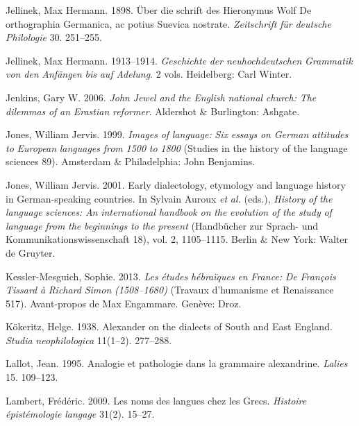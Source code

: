 \documentclass[output=paper]{langsci/langscibook}
\begin{document}
Jellinek, Max Hermann. 1898. Über die schrift des Hieronymus Wolf De orthographia Germanica, ac potius Suevica nostrate. \textit{Zeitschrift} \textit{für} \textit{deutsche} \textit{Philologie} 30. 251–255.

Jellinek, Max Hermann. 1913–1914. \textit{Geschichte} \textit{der} \textit{neuhochdeutschen} \textit{Grammatik} \textit{von} \textit{den} \textit{Anfängen} \textit{bis} \textit{auf} \textit{Adelung}. 2 vols. Heidelberg: Carl Winter.

Jenkins, Gary W. 2006. \textit{John} \textit{Jewel} \textit{and} \textit{the} \textit{English} \textit{national} \textit{church:} \textit{The} \textit{dilemmas} \textit{of} \textit{an} \textit{Erastian} \textit{reformer}. Aldershot \& Burlington: Ashgate.

Jones, William Jervis. 1999. \textit{Images} \textit{of} \textit{language:} \textit{Six} \textit{essays} \textit{on} \textit{German} \textit{attitudes} \textit{to} \textit{European} \textit{languages} \textit{from} \textit{1500} \textit{to} \textit{1800} (Studies in the history of the language sciences 89). Amsterdam \& Philadelphia: John Benjamins.

Jones, William Jervis. 2001. Early dialectology, etymology and language history in German-speaking countries. In Sylvain Auroux \textit{et} \textit{al.} (eds.), \textit{History} \textit{of} \textit{the} \textit{language} \textit{sciences:} \textit{An} \textit{international} \textit{handbook} \textit{on} \textit{the} \textit{evolution} \textit{of} \textit{the} \textit{study} \textit{of} \textit{language} \textit{from} \textit{the} \textit{beginnings} \textit{to} \textit{the} \textit{present} (Handbücher zur Sprach- und Kommunikationswissenschaft 18), vol. 2, 1105–1115. Berlin \& New York: Walter de Gruyter.

Kessler-Mesguich, Sophie. 2013. \textit{Les} \textit{études} \textit{hébraïques} \textit{en} \textit{France:} \textit{De} \textit{François} \textit{Tissard} \textit{à} \textit{Richard} \textit{Simon} \textit{(1508–1680)} (Travaux d’humanisme et Renaissance 517). Avant-propos de Max Engammare. Genève: Droz.

Kökeritz, Helge. 1938. Alexander \citet{Gill1621} on the dialects of South and East England. \textit{Studia} \textit{neophilologica} 11(1–2). 277–288.

Lallot, Jean. 1995. Analogie et pathologie dans la grammaire alexandrine. \textit{Lalies} 15. 109–123.

Lambert, Frédéric. 2009. Les noms des langues chez les Grecs. \textit{Histoire} \textit{épistémologie} \textit{langage} 31(2). 15–27.
\end{document}
